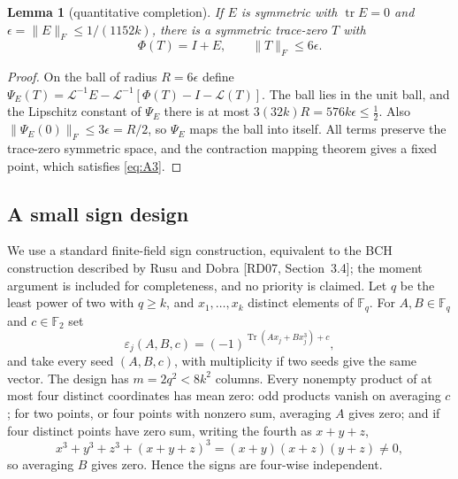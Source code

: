 \documentclass[11pt,a4paper]{article}
\newtheorem{lemma}[theorem]{Lemma}
\theoremstyle{definition}
\numberwithin{equation}{section}
\newcommand{\tr}{\operatorname{tr}}
\begin{document}
\begin{lemma}[quantitative completion]\label{lem:A1}
If $E$ is symmetric with $\tr E=0$ and $\epsilon=\|E\|_F\le1/(1152k)$, there is a symmetric trace-zero $T$ with
\begin{equation}\label{eq:A3}
 \Phi(T)=I+E,\qquad\|T\|_F\le6\epsilon.
\end{equation}
\end{lemma}

\begin{proof}
On the ball of radius $R=6\epsilon$ define $\Psi_E(T)=\mathcal L^{-1}E-\mathcal L^{-1}[\Phi(T)-I-\mathcal L(T)]$. The
ball lies in the unit ball, and the Lipschitz constant of $\Psi_E$ there is at most $3(32k)R=576k\epsilon\le\tfrac12$.
Also $\|\Psi_E(0)\|_F\le3\epsilon=R/2$, so $\Psi_E$ maps the ball into itself. All terms preserve the trace-zero
symmetric space, and the contraction mapping theorem gives a fixed point, which satisfies \eqref{eq:A3}.
\end{proof}

\subsection{A small sign design}
We use a standard finite-field sign construction, equivalent to the BCH construction described by Rusu and Dobra
[RD07, Section~3.4]; the moment argument is included for completeness, and no priority is claimed. Let $q$ be the
least power of two with $q\ge k$, and $x_1,\dots,x_k$ distinct elements of $\mathbb F_q$. For
$A,B\in\mathbb F_q$ and $c\in\mathbb F_2$ set
\begin{equation}\label{eq:A4}
 \varepsilon_j(A,B,c)=(-1)^{\operatorname{Tr}(Ax_j+Bx_j^3)+c},
\end{equation}
and take every seed $(A,B,c)$, with multiplicity if two seeds give the same vector. The design has $m=2q^2<8k^2$
columns. Every nonempty product of at most four distinct coordinates has mean zero: odd products vanish on averaging
$c$; for two points, or four points with nonzero sum, averaging $A$ gives zero; and if four distinct points have zero
sum, writing the fourth as $x+y+z$,
\begin{equation}\label{eq:A5}
 x^3+y^3+z^3+(x+y+z)^3=(x+y)(x+z)(y+z)\ne0,
\end{equation}
so averaging $B$ gives zero. Hence the signs are four-wise independent.
\end{document}
